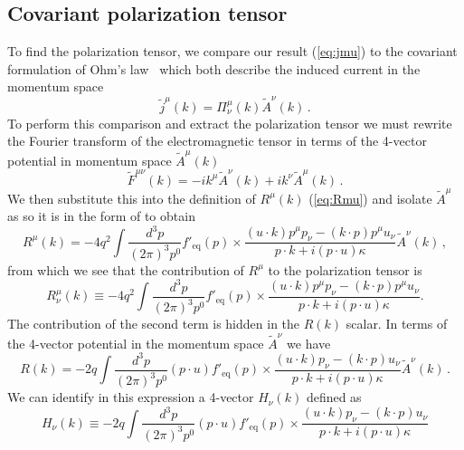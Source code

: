 \subsection{Covariant polarization tensor}

To find the polarization tensor, we compare our result (\ref{eq:jmu}) to the covariant formulation of Ohm's law~\cite{Starke:2014tfa} which both describe the induced current in the momentum space
\begin{equation}\label{eq:ohm}
\widetilde{j}^\mu(k) = \Pi^\mu_\nu(k) \widetilde{A}^\nu(k)\,.
\end{equation}
To perform this comparison and extract the polarization tensor we must rewrite the Fourier transform of the electromagnetic tensor in terms of the 4-vector potential in momentum space $\widetilde{A}^\mu(k)$
\begin{equation}\label{eq:ftfmunu}
\widetilde{F}^{\mu\nu}(k) = -i k^\mu \widetilde{A}^\nu(k) + i k^\nu \widetilde{A}^\mu(k)\,.
\end{equation}
We then substitute this into the definition of $R^\mu(k)$ (\ref{eq:Rmu}) and isolate $\widetilde{A}^\mu$ as so it is in the form of  to obtain \cite{Formanek:2021blc}
\begin{equation}
R^\mu(k) = - 4q^2 \int \frac{d^3p}{(2\pi)^3p^0} f'_\mathrm{eq}(p)
\times \frac{(u\cdot k)p^\mu p_\nu - (k \cdot p)p^\mu u_\nu}{p\cdot k + i (p \cdot u) \kappa} \widetilde{A}^\nu(k)\,,
\end{equation}
from which we see that the contribution of $R^\mu$ to the polarization tensor is
\begin{equation}\label{eq:Rmunu}
R^\mu_\nu(k) \equiv - 4q^2 \int \frac{d^3p}{(2\pi)^3p^0} f'_\mathrm{eq}(p)
\times\frac{(u\cdot k)p^\mu p_\nu - (k \cdot p)p^\mu u_\nu}{p\cdot k + i (p \cdot u) \kappa}.
\end{equation}
The contribution of the second term is hidden in the $R(k)$ scalar. In terms of the 4-vector potential in the momentum space $\widetilde{A}^\nu$ we have
\begin{equation}
R(k) = - 2q \int \frac{d^3p}{(2\pi)^3p^0}(p \cdot u)f'_\mathrm{eq}(p)
\times\frac{(u\cdot k)p_\nu - (k \cdot p)u_\nu}{p\cdot k + i (p \cdot u) \kappa}\widetilde{A}^\nu(k)\,.
\end{equation}
We can identify in this expression a 4-vector $H_\nu(k)$ defined as
\begin{equation}\label{eq:Hnu}
H_\nu(k) \equiv - 2q \int \frac{d^3p}{(2\pi)^3p^0}(p \cdot u)f'_\mathrm{eq}(p)
\times\frac{(u\cdot k)p_\nu - (k \cdot p)u_\nu}{p\cdot k + i (p \cdot u) \kappa}
\end{equation}
